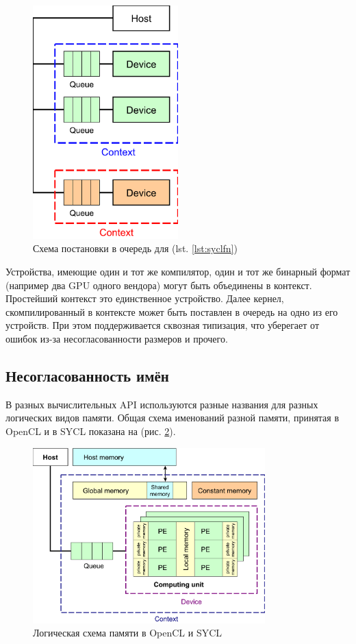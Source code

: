 \documentclass[a4paper,12pt,oneside]{article}
\begin{document}
\begin{figure}
\centering
\includegraphics[width=0.5\textwidth]{pictures/hetero-prog-queue.pdf}
\caption{Схема постановки в очередь для (lst. \ref{lst:syclfn})}
\label{fig:syclfn}
\end{figure}

Устройства, имеющие один и тот же компилятор, один и тот же бинарный формат (например два GPU одного вендора) могут быть объединены в контекст. Простейший контекст это единственное устройство. Далее кернел, скомпилированный в контексте может быть поставлен в очередь на одно из его устройств.
При этом поддерживается сквозная типизация, что уберегает от ошибок из-за несогласованности размеров и прочего.

\subsection{Несогласованность имён}\label{subsec:names}

В разных вычислительных API используются разные названия для разных логических видов памяти. Общая схема именований разной памяти, принятая в OpenCL и в SYCL показана на (рис. \ref{fig:logicalmemory}).

\begin{figure}
\centering
\includegraphics[width=0.8\textwidth]{pictures/logical-memory.pdf}
\caption{Логическая схема памяти в OpenCL и SYCL}
\label{fig:logicalmemory}
\end{figure}
\end{document}
